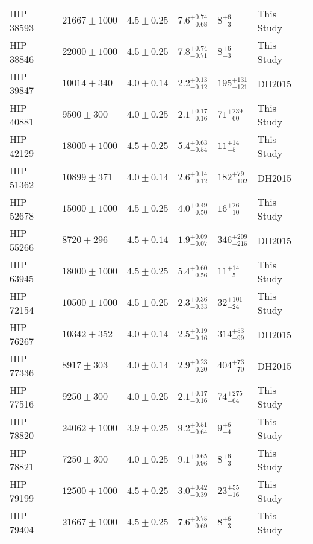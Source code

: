 \documentclass{emulateapj}
\begin{document}
\begin{longtable*}{|l|lllll|}
  HIP 38593 &  $21667 \pm 1000$ &  $4.5 \pm 0.25$ &  $7.6^{+0.74}_{-0.68}$ &        $8^{+6}_{-3}$ &  This Study \\
  HIP 38846 &  $22000 \pm 1000$ &  $4.5 \pm 0.25$ &  $7.8^{+0.74}_{-0.71}$ &        $8^{+6}_{-3}$ &  This Study \\
  HIP 39847 &   $10014 \pm 340$ &  $4.0 \pm 0.14$ &  $2.2^{+0.13}_{-0.12}$ &  $195^{+131}_{-121}$ &      DH2015 \\
  HIP 40881 &    $9500 \pm 300$ &  $4.0 \pm 0.25$ &  $2.1^{+0.17}_{-0.16}$ &    $71^{+239}_{-60}$ &  This Study \\
  HIP 42129 &  $18000 \pm 1000$ &  $4.5 \pm 0.25$ &  $5.4^{+0.63}_{-0.54}$ &      $11^{+14}_{-5}$ &  This Study \\
  HIP 51362 &   $10899 \pm 371$ &  $4.0 \pm 0.14$ &  $2.6^{+0.14}_{-0.12}$ &   $182^{+79}_{-102}$ &      DH2015 \\
  HIP 52678 &  $15000 \pm 1000$ &  $4.5 \pm 0.25$ &  $4.0^{+0.49}_{-0.50}$ &     $16^{+26}_{-10}$ &  This Study \\
  HIP 55266 &    $8720 \pm 296$ &  $4.5 \pm 0.14$ &  $1.9^{+0.09}_{-0.07}$ &  $346^{+209}_{-215}$ &      DH2015 \\
  HIP 63945 &  $18000 \pm 1000$ &  $4.5 \pm 0.25$ &  $5.4^{+0.60}_{-0.56}$ &      $11^{+14}_{-5}$ &  This Study \\
  HIP 72154 &  $10500 \pm 1000$ &  $4.5 \pm 0.25$ &  $2.3^{+0.36}_{-0.33}$ &    $32^{+101}_{-24}$ &  This Study \\
  HIP 76267 &   $10342 \pm 352$ &  $4.0 \pm 0.14$ &  $2.5^{+0.19}_{-0.16}$ &    $314^{+53}_{-99}$ &      DH2015 \\
  HIP 77336 &    $8917 \pm 303$ &  $4.0 \pm 0.14$ &  $2.9^{+0.23}_{-0.20}$ &    $404^{+73}_{-70}$ &      DH2015 \\
  HIP 77516 &    $9250 \pm 300$ &  $4.0 \pm 0.25$ &  $2.1^{+0.17}_{-0.16}$ &    $74^{+275}_{-64}$ &  This Study \\
  HIP 78820 &  $24062 \pm 1000$ &  $3.9 \pm 0.25$ &  $9.2^{+0.51}_{-0.64}$ &        $9^{+6}_{-4}$ &  This Study \\
  HIP 78821 &    $7250 \pm 300$ &  $4.0 \pm 0.25$ &  $9.1^{+0.65}_{-0.96}$ &        $8^{+6}_{-3}$ &  This Study \\
  HIP 79199 &  $12500 \pm 1000$ &  $4.5 \pm 0.25$ &  $3.0^{+0.42}_{-0.39}$ &     $23^{+55}_{-16}$ &  This Study \\
  HIP 79404 &  $21667 \pm 1000$ &  $4.5 \pm 0.25$ &  $7.6^{+0.75}_{-0.69}$ &        $8^{+6}_{-3}$ &  This Study \\

\end{longtable*}
\end{document}
